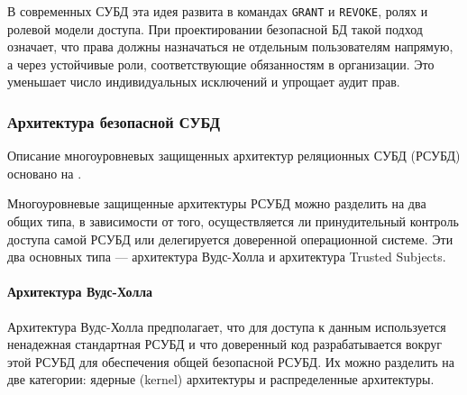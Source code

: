 В современных СУБД эта идея развита в командах \texttt{GRANT} и \texttt{REVOKE}, ролях и ролевой модели
доступа. При проектировании безопасной БД такой подход означает, что права должны назначаться не отдельным
пользователям напрямую, а через устойчивые роли, соответствующие обязанностям в организации. Это уменьшает
число индивидуальных исключений и упрощает аудит прав.

\subsubsection{Архитектура безопасной СУБД}

Описание многоуровневых защищенных архитектур реляционных СУБД (РСУБД) основано на \autocite{Rjaibi}.

Многоуровневые защищенные архитектуры РСУБД можно разделить на два общих типа, в зависимости от того,
осуществляется ли принудительный контроль доступа самой РСУБД или делегируется доверенной операционной системе.
Эти два основных типа --- архитектура Вудс-Холла и архитектура Trusted Subjects.
\paragraph{Архитектура Вудс-Холла}
Архитектура Вудс-Холла предполагает, что для доступа к данным используется ненадежная стандартная РСУБД
и что доверенный код разрабатывается вокруг этой РСУБД для обеспечения общей безопасной РСУБД.
Их можно разделить на две категории: ядерные (kernel) архитектуры и распределенные архитектуры.
